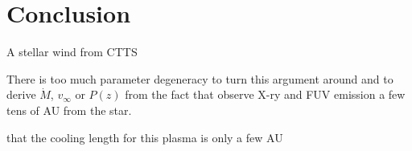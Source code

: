 \section{Conclusion}
\label{sect:conclusion}
A stellar wind from CTTS 

There is too much parameter degeneracy to turn this argument around and to derive $\dot M$, $v_\infty$ or $P(z)$ from the fact that observe X-ry and FUV emission a few tens of AU from the star.


\citet{2009A&A...493..579G} 
\citep{2000ApJ...537L..49B}

that the cooling length for this plasma is only a few AU 
